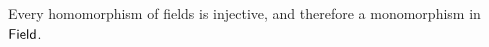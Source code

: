 \subsection{}

Every homomorphism of fields is injective, and therefore a monomorphism in~$\mathsf{Field}$.
